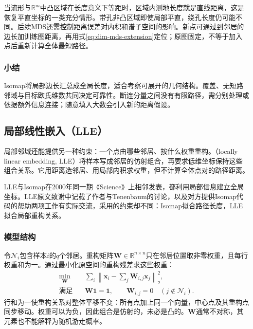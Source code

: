 当流形与$\mathbb{R}^m$中凸区域在长度意义下等距时，区域内测地长度就是直线距离，这是恢复平直坐标的一类充分情形。带孔非凸区域即使局部平直，绕孔长度仍可能不同。后续MDS还需控制距离误差对内积和谱子空间的影响。新点可通过到邻居的边长加训练图距离，再用式\eqref{eq:dim-mds-extension}定位；原图固定，不等于加入点后重新计算全体最短路径。

\subsubsection{小结}

Isomap将局部边长汇总成全局长度，适合考察可展开的几何结构。覆盖、无短路邻域与目标欧氏维数共同决定可靠性。断连分量之间没有有限路径，需分别处理或依据额外信息连接；随意填入大数会引入新的距离假设。

\subsection{局部线性嵌入（LLE）}
\label{sec:dim-lle}

局部邻域还能提供另一种约束：一个点由哪些邻居、按什么权重重构。（locally linear embedding, LLE）将样本写成邻居的仿射组合，再要求低维坐标保持这些组合关系。它用距离选邻居、用局部内积求权重，但不计算全体点对的路径距离。

LLE与Isomap在2000年同一期《Science》上相邻发表，都利用局部信息建立全局坐标。LLE原文致谢中记载了作者与Tenenbaum的讨论，以及对方提供Isomap代码的帮助两项工作有实际交流，采用的约束却不同：Isomap拟合路径长度，LLE拟合局部重构关系。

\subsubsection{模型结构}

令$\mathcal{N}_i$包含样本$i$的$q$个邻居。重构矩阵$\bm{W}\in\mathbb{R}^{n\times n}$只在邻居位置取非零权重，且每行权重和为一。通过最小化原空间的重构残差求这些权重：
\begin{equation}
  \label{eq:dim-lle-weights}
  \begin{aligned}
    \min_{\bm{W}}\quad&
      \sum_i\left\lVert\bm{x}_i-\sum_j\bm{W}_{i,j}\bm{x}_j
      \right\rVert_2^2,\\
    \text{满足}\quad&
      \bm{W}\bm{1}=\bm{1},\qquad
      \bm{W}_{i,j}=0\quad(j\notin\mathcal{N}_i).
  \end{aligned}
\end{equation}
行和为一使重构关系对整体平移不变：所有点加上同一个向量，中心点及其重构点同步移动。权重可以为负，因此组合是仿射的，未必是凸的。$\bm{W}$通常不对称，其元素也不能解释为随机游走概率。

